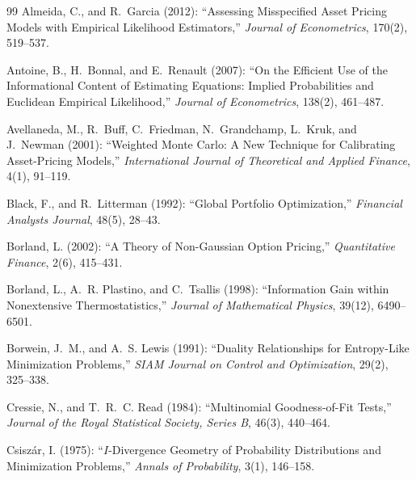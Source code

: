 \documentclass[11pt]{article}
\begin{document}
\begin{thebibliography}{99}
Almeida, C., and R.~Garcia (2012): ``Assessing Misspecified Asset Pricing
Models with Empirical Likelihood Estimators,'' \textit{Journal of
Econometrics}, 170(2), 519--537.

Antoine, B., H.~Bonnal, and E.~Renault (2007): ``On the Efficient Use of the
Informational Content of Estimating Equations: Implied Probabilities and
Euclidean Empirical Likelihood,'' \textit{Journal of Econometrics}, 138(2),
461--487.

Avellaneda, M., R.~Buff, C.~Friedman, N.~Grandchamp, L.~Kruk, and J.~Newman
(2001): ``Weighted Monte Carlo: A New Technique for Calibrating Asset-Pricing
Models,'' \textit{International Journal of Theoretical and Applied Finance},
4(1), 91--119.

Black, F., and R.~Litterman (1992): ``Global Portfolio Optimization,''
\textit{Financial Analysts Journal}, 48(5), 28--43.

Borland, L. (2002): ``A Theory of Non-Gaussian Option Pricing,''
\textit{Quantitative Finance}, 2(6), 415--431.

Borland, L., A.~R. Plastino, and C.~Tsallis (1998): ``Information Gain within
Nonextensive Thermostatistics,'' \textit{Journal of Mathematical Physics},
39(12), 6490--6501.

Borwein, J.~M., and A.~S. Lewis (1991): ``Duality Relationships for
Entropy-Like Minimization Problems,'' \textit{SIAM Journal on Control and
Optimization}, 29(2), 325--338.

Cressie, N., and T.~R.~C. Read (1984): ``Multinomial Goodness-of-Fit
Tests,'' \textit{Journal of the Royal Statistical Society, Series B},
46(3), 440--464.

Csisz\'ar, I. (1975): ``$I$-Divergence Geometry of Probability
Distributions and Minimization Problems,'' \textit{Annals of Probability},
3(1), 146--158.


\end{thebibliography}
\end{document}
